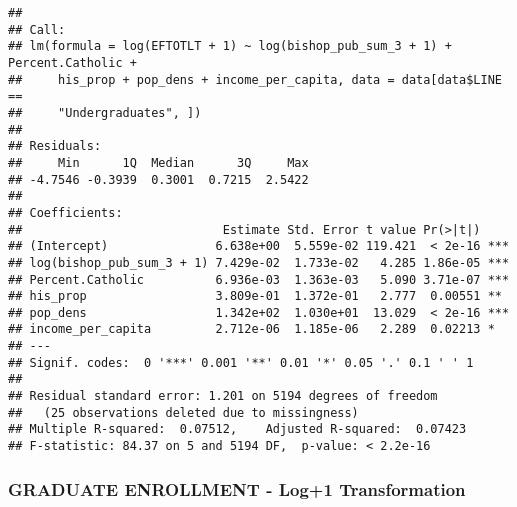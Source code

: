 \documentclass[]{article}
\newenvironment{Shaded}{\begin{snugshade}}{\end{snugshade}}
\newcommand{\KeywordTok}[1]{\textcolor[rgb]{0.13,0.29,0.53}{\textbf{#1}}}
\newcommand{\DataTypeTok}[1]{\textcolor[rgb]{0.13,0.29,0.53}{#1}}
\newcommand{\DecValTok}[1]{\textcolor[rgb]{0.00,0.00,0.81}{#1}}
\newcommand{\StringTok}[1]{\textcolor[rgb]{0.31,0.60,0.02}{#1}}
\newcommand{\OperatorTok}[1]{\textcolor[rgb]{0.81,0.36,0.00}{\textbf{#1}}}
\newcommand{\NormalTok}[1]{#1}
\begin{document}
\begin{verbatim}
## 
## Call:
## lm(formula = log(EFTOTLT + 1) ~ log(bishop_pub_sum_3 + 1) + Percent.Catholic + 
##     his_prop + pop_dens + income_per_capita, data = data[data$LINE == 
##     "Undergraduates", ])
## 
## Residuals:
##     Min      1Q  Median      3Q     Max 
## -4.7546 -0.3939  0.3001  0.7215  2.5422 
## 
## Coefficients:
##                            Estimate Std. Error t value Pr(>|t|)    
## (Intercept)               6.638e+00  5.559e-02 119.421  < 2e-16 ***
## log(bishop_pub_sum_3 + 1) 7.429e-02  1.733e-02   4.285 1.86e-05 ***
## Percent.Catholic          6.936e-03  1.363e-03   5.090 3.71e-07 ***
## his_prop                  3.809e-01  1.372e-01   2.777  0.00551 ** 
## pop_dens                  1.342e+02  1.030e+01  13.029  < 2e-16 ***
## income_per_capita         2.712e-06  1.185e-06   2.289  0.02213 *  
## ---
## Signif. codes:  0 '***' 0.001 '**' 0.01 '*' 0.05 '.' 0.1 ' ' 1
## 
## Residual standard error: 1.201 on 5194 degrees of freedom
##   (25 observations deleted due to missingness)
## Multiple R-squared:  0.07512,    Adjusted R-squared:  0.07423 
## F-statistic: 84.37 on 5 and 5194 DF,  p-value: < 2.2e-16
\end{verbatim}

\subsubsection{GRADUATE ENROLLMENT - Log+1
Transformation}\label{graduate-enrollment---log1-transformation}

\begin{Shaded}
\end{Shaded}
\end{document}
